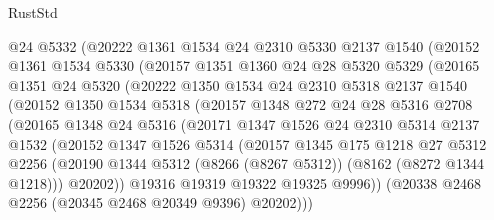 \begin{lexlean}{RustStd}
\begin{coremodule}
              @24
              @5332
              (@20222
                @1361
                @1534
                @24
                @2310
                @5330
                @2137
                @1540
                (@20152
                  @1361
                  @1534
                  @5330
                  (@20157
                    @1351
                    @1360
                    @24
                    @28
                    @5320
                    @5329
                    (@20165
                      @1351
                      @24
                      @5320
                      (@20222
                        @1350
                        @1534
                        @24
                        @2310
                        @5318
                        @2137
                        @1540
                        (@20152
                          @1350
                          @1534
                          @5318
                          (@20157
                            @1348
                            @272
                            @24
                            @28
                            @5316
                            @2708
                            (@20165
                              @1348
                              @24
                              @5316
                              (@20171
                                @1347
                                @1526
                                @24
                                @2310
                                @5314
                                @2137
                                @1532
                                (@20152
                                  @1347
                                  @1526
                                  @5314
                                  (@20157
                                    @1345
                                    @175
                                    @1218
                                    @27
                                    @5312
                                    @2256
                                    (@20190
                                      @1344
                                      @5312
                                      (@8266 (@8267 @5312))
                                      (@8162 (@8272 @1344 @1218)))
                                    @20202))
                                @19316
                                @19319
                                @19322
                                @19325
                                @9996))
                            (@20338 @2468 @2256 (@20345 @2468 @20349 @9396) @20202)))

\end{coremodule}
\end{lexlean}
